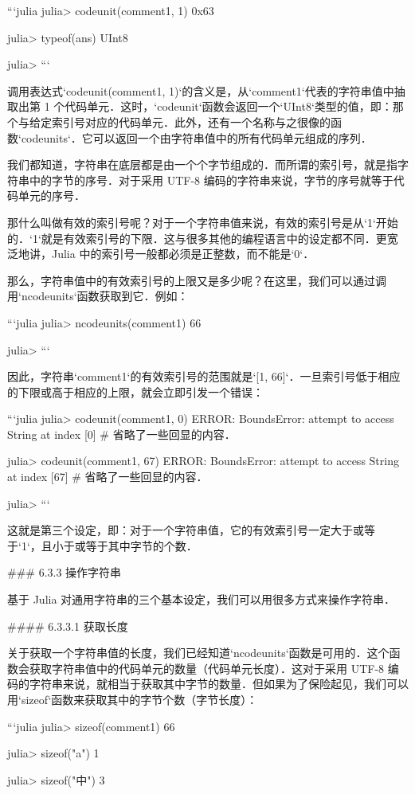 ```julia
julia> codeunit(comment1, 1)
0x63

julia> typeof(ans)
UInt8

julia> 
```

调用表达式`codeunit(comment1, 1)`的含义是，从`comment1`代表的字符串值中抽取出第 1 个代码单元．这时，`codeunit`函数会返回一个`UInt8`类型的值，即：那个与给定索引号对应的代码单元．此外，还有一个名称与之很像的函数`codeunits`．它可以返回一个由字符串值中的所有代码单元组成的序列．

我们都知道，字符串在底层都是由一个个字节组成的．而所谓的索引号，就是指字符串中的字节的序号．对于采用 UTF-8 编码的字符串来说，字节的序号就等于代码单元的序号．

那什么叫做有效的索引号呢？对于一个字符串值来说，有效的索引号是从`1`开始的．`1`就是有效索引号的下限．这与很多其他的编程语言中的设定都不同．更宽泛地讲，Julia 中的索引号一般都必须是正整数，而不能是`0`．

那么，字符串值中的有效索引号的上限又是多少呢？在这里，我们可以通过调用`ncodeunits`函数获取到它．例如：

```julia
julia> ncodeunits(comment1)
66

julia> 
```

因此，字符串`comment1`的有效索引号的范围就是`[1, 66]`．一旦索引号低于相应的下限或高于相应的上限，就会立即引发一个错误：

```julia
julia> codeunit(comment1, 0)
ERROR: BoundsError: attempt to access String
  at index [0]
# 省略了一些回显的内容．

julia> codeunit(comment1, 67)
ERROR: BoundsError: attempt to access String
  at index [67]
# 省略了一些回显的内容．

julia> 
```

这就是第三个设定，即：对于一个字符串值，它的有效索引号一定大于或等于`1`，且小于或等于其中字节的个数．

### 6.3.3 操作字符串

基于 Julia 对通用字符串的三个基本设定，我们可以用很多方式来操作字符串．

#### 6.3.3.1 获取长度

关于获取一个字符串值的长度，我们已经知道`ncodeunits`函数是可用的．这个函数会获取字符串值中的代码单元的数量（代码单元长度）．这对于采用 UTF-8 编码的字符串来说，就相当于获取其中字节的数量．但如果为了保险起见，我们可以用`sizeof`函数来获取其中的字节个数（字节长度）：

```julia
julia> sizeof(comment1)
66

julia> sizeof("a")
1

julia> sizeof("中")
3

